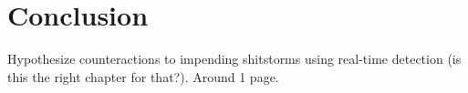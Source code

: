 \chapter{Conclusion}
\label{ch:conclusion}

Hypothesize counteractions to impending shitstorms using real-time detection (is this the right chapter for that?).
Around 1 page.
\pagebreak[1]

